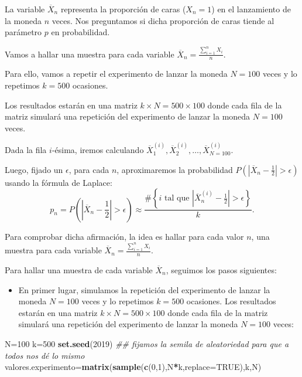 \documentclass[]{book}
\newenvironment{Shaded}{\begin{snugshade}}{\end{snugshade}}
\newcommand{\CommentTok}[1]{\textcolor[rgb]{0.56,0.35,0.01}{\textit{#1}}}
\newcommand{\DataTypeTok}[1]{\textcolor[rgb]{0.13,0.29,0.53}{#1}}
\newcommand{\DecValTok}[1]{\textcolor[rgb]{0.00,0.00,0.81}{#1}}
\newcommand{\KeywordTok}[1]{\textcolor[rgb]{0.13,0.29,0.53}{\textbf{#1}}}
\newcommand{\NormalTok}[1]{#1}
\newcommand{\OperatorTok}[1]{\textcolor[rgb]{0.81,0.36,0.00}{\textbf{#1}}}
\newcommand{\OtherTok}[1]{\textcolor[rgb]{0.56,0.35,0.01}{#1}}
\providecommand{\tightlist}{%
  \setlength{\itemsep}{0pt}\setlength{\parskip}{0pt}}
\begin{document}
La variable \(\overline{X}_n\) representa la proporción de caras (\(X_n=1\)) en el lanzamiento de la moneda \(n\) veces. Nos preguntamos si dicha proporción de caras tiende al parámetro \(p\) en probabilidad.

Vamos a hallar una muestra para cada variable \(\overline{X}_n=\frac{\sum\limits_{i=1}^n X_i}{n}\).

Para ello, vamos a repetir el experimento de lanzar la moneda \(N=100\) veces y lo repetimos \(k=500\) ocasiones.

Los resultados estarán en una matriz \(k\times N =500\times 100\) donde cada fila de la matriz simulará una repetición del experimento de lanzar la moneda \(N=100\) veces.

Dada la fila \(i\)-ésima, iremos calculando \(\overline{X}_1^{(i)},\overline{X}_2^{(i)},\ldots,\overline{X}_{N=100}^{(i)}\).

Luego, fijado un \(\epsilon\), para cada \(n\), aproximaremos la probabilidad \(P\left(\left|\overline{X}_n-\frac{1}{2}\right|>\epsilon\right)\) usando la fórmula de Laplace:
\[
p_n=P\left(\left|\overline{X}_n-\frac{1}{2}\right|>\epsilon\right) \approx\frac{\#\left\{\mbox{$i$ tal que  $\left|\overline{X}_n^{(i)}-\frac{1}{2}\right|>\epsilon$}\right\}}{k}.
\]

Para comprobar dicha afirmación, la idea es hallar para cada valor \(n\), una muestra para cada variable \(\overline{X}_n=\frac{\sum\limits_{i=1}^n X_i}{n}\).

Para hallar una muestra de cada variable \(\overline{X}_n\), seguimos los pasos siguientes:

\begin{itemize}
\tightlist
\item
  En primer lugar, simulamos la repetición del experimento de lanzar la moneda \(N=100\) veces y lo repetimos \(k=500\) ocasiones.
  Los resultados estarán en una matriz \(k\times N =500\times 100\) donde cada fila de la matriz simulará una repetición del experimento de lanzar la moneda \(N=100\) veces:
\end{itemize}

\begin{Shaded}
\begin{Highlighting}[]
\NormalTok{N=}\DecValTok{100}
\NormalTok{k=}\DecValTok{500}
\KeywordTok{set.seed}\NormalTok{(}\DecValTok{2019}\NormalTok{) }\CommentTok{## fijamos la semila de aleatoriedad para que a todos nos dé lo mismo}
\NormalTok{valores.experimento=}\KeywordTok{matrix}\NormalTok{(}\KeywordTok{sample}\NormalTok{(}\KeywordTok{c}\NormalTok{(}\DecValTok{0}\NormalTok{,}\DecValTok{1}\NormalTok{),N}\OperatorTok{*}\NormalTok{k,}\DataTypeTok{replace=}\OtherTok{TRUE}\NormalTok{),k,N)}
\end{Highlighting}
\end{Shaded}
\end{document}

